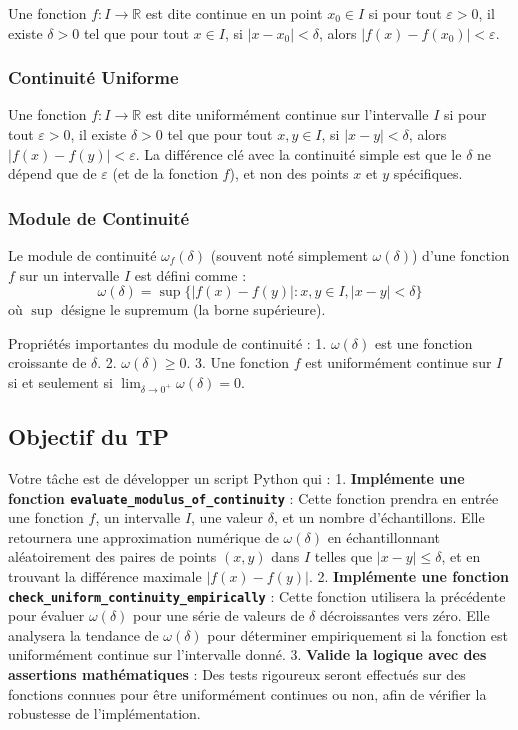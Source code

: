 \documentclass[12pt,a4paper]{report}
\begin{document}
Une fonction $f: I \to \mathbb{R}$ est dite continue en un point $x_0 \in I$ si pour tout $\varepsilon > 0$, il existe $\delta > 0$ tel que pour tout $x \in I$, si $|x - x_0| < \delta$, alors $|f(x) - f(x_0)| < \varepsilon$.

\subsubsection{Continuité Uniforme}

Une fonction $f: I \to \mathbb{R}$ est dite uniformément continue sur l'intervalle $I$ si pour tout $\varepsilon > 0$, il existe $\delta > 0$ tel que pour tout $x, y \in I$, si $|x - y| < \delta$, alors $|f(x) - f(y)| < \varepsilon$.
La différence clé avec la continuité simple est que le $\delta$ ne dépend que de $\varepsilon$ (et de la fonction $f$), et non des points $x$ et $y$ spécifiques.

\subsubsection{Module de Continuité}

Le module de continuité $\omega_f(\delta)$ (souvent noté simplement $\omega(\delta)$) d'une fonction $f$ sur un intervalle $I$ est défini comme :
$$ \omega(\delta) = \sup \{ |f(x) - f(y)| : x, y \in I, |x - y| < \delta \} $$
où $\sup$ désigne le supremum (la borne supérieure).

Propriétés importantes du module de continuité :
1.  $\omega(\delta)$ est une fonction croissante de $\delta$.
2.  $\omega(\delta) \ge 0$.
3.  Une fonction $f$ est uniformément continue sur $I$ si et seulement si $\lim_{\delta \to 0^+} \omega(\delta) = 0$.

\subsection{Objectif du TP}

Votre tâche est de développer un script Python qui :
1.  \textbf{Implémente une fonction \texttt{evaluate\_modulus\_of\_continuity}} : Cette fonction prendra en entrée une fonction $f$, un intervalle $I$, une valeur $\delta$, et un nombre d'échantillons. Elle retournera une approximation numérique de $\omega(\delta)$ en échantillonnant aléatoirement des paires de points $(x, y)$ dans $I$ telles que $|x - y| \le \delta$, et en trouvant la différence maximale $|f(x) - f(y)|$.
2.  \textbf{Implémente une fonction \texttt{check\_uniform\_continuity\_empirically}} : Cette fonction utilisera la précédente pour évaluer $\omega(\delta)$ pour une série de valeurs de $\delta$ décroissantes vers zéro. Elle analysera la tendance de $\omega(\delta)$ pour déterminer empiriquement si la fonction est uniformément continue sur l'intervalle donné.
3.  \textbf{Valide la logique avec des assertions mathématiques} : Des tests rigoureux seront effectués sur des fonctions connues pour être uniformément continues ou non, afin de vérifier la robustesse de l'implémentation.
\end{document}
